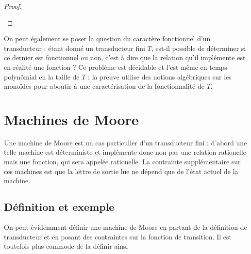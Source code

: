 \documentclass{scrartcl}
\begin{document}
\begin{flushleft}
\begin{proof}
\begin{figure}[h]
\begin{center}
    \end{center}
\end{figure}
\end{proof}

On peut également se poser la question du caractère fonctionnel d'un transducteur : étant donné un transducteur fini $T$, est-il possible de déterminer
si ce dernier est fonctionnel ou non, c'est à dire que la relation qu'il implémente est en réalité une fonction ? Ce problème est décidable
\cite{sakarovitch} et l'est même en temps polynômial en la taille de $T$ : la preuve utilise des notions algébriques sur les monoïdes pour
aboutir à une caractérisation de la fonctionnalité de $T$.

\section{Machines de Moore}

Une machine de Moore est un cas particulier d'un transducteur fini : d'abord une telle machine est déterministe
et implémente donc non pas une relation rationelle mais une fonction, qui sera appelée rationelle. La contrainte
supplémentaire sur ces machines est que la lettre de sortie lue ne dépend que de l'état actuel de la machine.

\subsection{Définition et exemple}

On peut évidemment définir une machine de Moore en partant de la définition de transducteur et en posant des
contraintes sur la fonction de transition. Il est toutefois plus commode de la définir ainsi


\end{flushleft}
\end{document}
